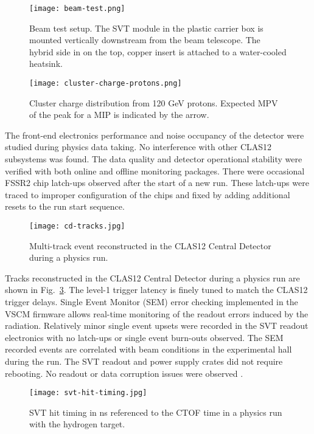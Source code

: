 \begin{figure}[hbt] 
\centering 
\texttt{[image: beam-test.png]}
\caption{Beam test setup. The SVT module in the plastic carrier box is mounted vertically downstream from the beam telescope. The hybrid side in on the top, copper insert is attached to a water-cooled heatsink.}
\label{fig:beam-test}
\end{figure}

\begin{figure}[h] 
\centering 
\texttt{[image: cluster-charge-protons.png]}
\caption{Cluster charge distribution from 120 GeV protons. Expected MPV of the peak for a MIP is indicated by the arrow.}
\label{fig:cluster-charge-protons}
\end{figure}

The front-end electronics performance and noise occupancy of the detector were studied during physics data taking. No interference with other CLAS12 subsystems was found. The data quality and detector operational stability  were verified with both online and offline monitoring packages. There were occasional FSSR2 chip latch-ups observed after the start of a new run. These latch-ups were traced to improper configuration of the chips and fixed by adding additional resets to the run start sequence.

\begin{figure}[h] 
\centering 
\texttt{[image: cd-tracks.jpg]}
\caption{Multi-track event reconstructed in the CLAS12 Central Detector during a physics run.}
\label{fig:cd-tracks}
\end{figure}

Tracks reconstructed in the CLAS12 Central Detector during a physics run are shown in Fig.~\ref{fig:cd-tracks}. The level-1 trigger latency is finely tuned to match the CLAS12 trigger delays. Single Event Monitor (SEM) error checking implemented in the VSCM firmware allows real-time monitoring of the readout errors induced by the radiation. Relatively minor single event upsets were recorded in the SVT readout electronics with no latch-ups or single event burn-outs observed. The SEM recorded events are correlated with beam conditions in the experimental hall during the run. The SVT readout and power supply crates did not require rebooting. No readout or data corruption issues were observed \cite{SEENOTE}. 

\begin{figure}[htb] 
\centering 
\texttt{[image: svt-hit-timing.jpg]}
\caption{SVT hit timing in ns referenced to the CTOF time in a physics run with the hydrogen target.}
\label{fig:svt-hit-timing}
\end{figure}

